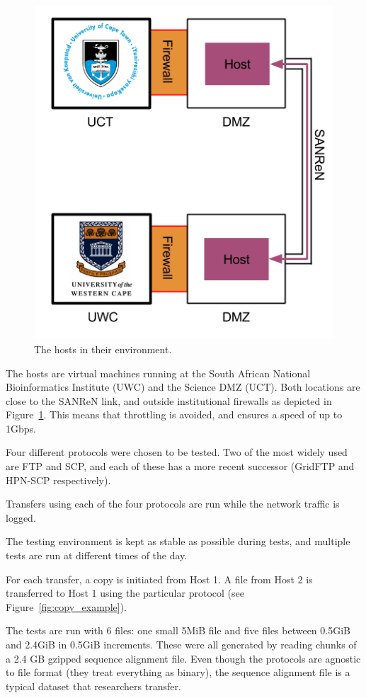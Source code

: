 \documentclass{sig-alternate-05-2015}
\begin{document}
\begin{figure}[h]
\centering
	\includegraphics[width=.6\linewidth]{img/route.png}
\caption{The hosts in their environment.\label{fig:route}}
\end{figure}

The hosts are virtual machines running at the South African National Bioinformatics Institute (UWC) and the Science DMZ (UCT). Both locations are close to the SANReN link, and outside institutional firewalls as depicted in Figure~\ref{fig:route}. This means that throttling is avoided, and ensures a speed of up to 1Gbps.

Four different protocols were chosen to be tested. Two of the most widely used are FTP and SCP, and each of these has a more recent successor (GridFTP and HPN-SCP respectively).

Transfers using each of the four protocols are run while the network traffic is logged.

The testing environment is kept as stable as possible during tests, and multiple tests are run at different times of the day.

For each transfer, a copy is initiated from Host 1. A file from Host 2 is transferred to Host 1 using the particular protocol (see Figure~\ref{fig:copy_example}).

The tests are run with 6 files: one small 5MiB file and five files between 0.5GiB and 2.4GiB in 0.5GiB increments. These were all generated by reading chunks of a 2.4 GB gzipped sequence alignment file. Even though the protocols are agnostic to file format (they treat everything as binary), the sequence alignment file is a typical dataset that researchers transfer.
\end{document}

